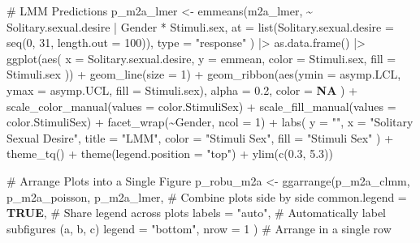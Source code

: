 \documentclass[
  bookmarksnumbered]{article}
\newenvironment{Shaded}{\begin{snugshade}}{\end{snugshade}}
\newcommand{\AttributeTok}[1]{\textcolor[rgb]{0.80,0.80,0.80}{#1}}
\newcommand{\CommentTok}[1]{\textcolor[rgb]{0.50,0.62,0.50}{#1}}
\newcommand{\ConstantTok}[1]{\textcolor[rgb]{0.86,0.64,0.64}{\textbf{#1}}}
\newcommand{\DecValTok}[1]{\textcolor[rgb]{0.86,0.86,0.80}{#1}}
\newcommand{\FloatTok}[1]{\textcolor[rgb]{0.75,0.75,0.82}{#1}}
\newcommand{\FunctionTok}[1]{\textcolor[rgb]{0.94,0.94,0.56}{#1}}
\newcommand{\NormalTok}[1]{\textcolor[rgb]{0.80,0.80,0.80}{#1}}
\newcommand{\OtherTok}[1]{\textcolor[rgb]{0.94,0.94,0.56}{#1}}
\newcommand{\SpecialCharTok}[1]{\textcolor[rgb]{0.86,0.64,0.64}{#1}}
\newcommand{\StringTok}[1]{\textcolor[rgb]{0.80,0.58,0.58}{#1}}
\begin{document}
\begin{Shaded}
\begin{Highlighting}[]
\CommentTok{\# LMM Predictions}
\NormalTok{p\_m2a\_lmer }\OtherTok{\textless{}{-}} \FunctionTok{emmeans}\NormalTok{(m2a\_lmer, }\SpecialCharTok{\textasciitilde{}}\NormalTok{ Solitary.sexual.desire }\SpecialCharTok{|}\NormalTok{ Gender }\SpecialCharTok{*}\NormalTok{ Stimuli.sex,}
  \AttributeTok{at =} \FunctionTok{list}\NormalTok{(}\AttributeTok{Solitary.sexual.desire =} \FunctionTok{seq}\NormalTok{(}\DecValTok{0}\NormalTok{, }\DecValTok{31}\NormalTok{, }\AttributeTok{length.out =} \DecValTok{100}\NormalTok{)),}
  \AttributeTok{type =} \StringTok{"response"}
\NormalTok{) }\SpecialCharTok{|\textgreater{}}
  \FunctionTok{as.data.frame}\NormalTok{() }\SpecialCharTok{|\textgreater{}}
  \FunctionTok{ggplot}\NormalTok{(}\FunctionTok{aes}\NormalTok{(}
    \AttributeTok{x =}\NormalTok{ Solitary.sexual.desire, }\AttributeTok{y =}\NormalTok{ emmean,}
    \AttributeTok{color =}\NormalTok{ Stimuli.sex, }\AttributeTok{fill =}\NormalTok{ Stimuli.sex}
\NormalTok{  )) }\SpecialCharTok{+}
  \FunctionTok{geom\_line}\NormalTok{(}\AttributeTok{size =} \DecValTok{1}\NormalTok{) }\SpecialCharTok{+}
  \FunctionTok{geom\_ribbon}\NormalTok{(}\FunctionTok{aes}\NormalTok{(}\AttributeTok{ymin =}\NormalTok{ asymp.LCL, }\AttributeTok{ymax =}\NormalTok{ asymp.UCL, }\AttributeTok{fill =}\NormalTok{ Stimuli.sex),}
    \AttributeTok{alpha =} \FloatTok{0.2}\NormalTok{, }\AttributeTok{color =} \ConstantTok{NA}
\NormalTok{  ) }\SpecialCharTok{+}
  \FunctionTok{scale\_color\_manual}\NormalTok{(}\AttributeTok{values =}\NormalTok{ color.StimuliSex) }\SpecialCharTok{+}
  \FunctionTok{scale\_fill\_manual}\NormalTok{(}\AttributeTok{values =}\NormalTok{ color.StimuliSex) }\SpecialCharTok{+}
  \FunctionTok{facet\_wrap}\NormalTok{(}\SpecialCharTok{\textasciitilde{}}\NormalTok{Gender, }\AttributeTok{ncol =} \DecValTok{1}\NormalTok{) }\SpecialCharTok{+}
  \FunctionTok{labs}\NormalTok{(}
    \AttributeTok{y =} \StringTok{""}\NormalTok{, }\AttributeTok{x =} \StringTok{"Solitary Sexual Desire"}\NormalTok{,}
    \AttributeTok{title =} \StringTok{"LMM"}\NormalTok{,}
    \AttributeTok{color =} \StringTok{"Stimuli Sex"}\NormalTok{, }\AttributeTok{fill =} \StringTok{"Stimuli Sex"}
\NormalTok{  ) }\SpecialCharTok{+}
  \FunctionTok{theme\_tq}\NormalTok{() }\SpecialCharTok{+}
  \FunctionTok{theme}\NormalTok{(}\AttributeTok{legend.position =} \StringTok{"top"}\NormalTok{) }\SpecialCharTok{+}
  \FunctionTok{ylim}\NormalTok{(}\FunctionTok{c}\NormalTok{(}\FloatTok{0.3}\NormalTok{, }\FloatTok{5.3}\NormalTok{))}

\CommentTok{\# Arrange Plots into a Single Figure}
\NormalTok{p\_robu\_m2a }\OtherTok{\textless{}{-}} \FunctionTok{ggarrange}\NormalTok{(p\_m2a\_clmm, p\_m2a\_poisson, p\_m2a\_lmer, }\CommentTok{\# Combine plots side by side}
  \AttributeTok{common.legend =} \ConstantTok{TRUE}\NormalTok{, }\CommentTok{\# Share legend across plots}
  \AttributeTok{labels =} \StringTok{"auto"}\NormalTok{, }\CommentTok{\# Automatically label subfigures (a, b, c)}
  \AttributeTok{legend =} \StringTok{"bottom"}\NormalTok{,}
  \AttributeTok{nrow =} \DecValTok{1}
\NormalTok{) }\CommentTok{\# Arrange in a single row}


\end{Highlighting}
\end{Shaded}
\end{document}
